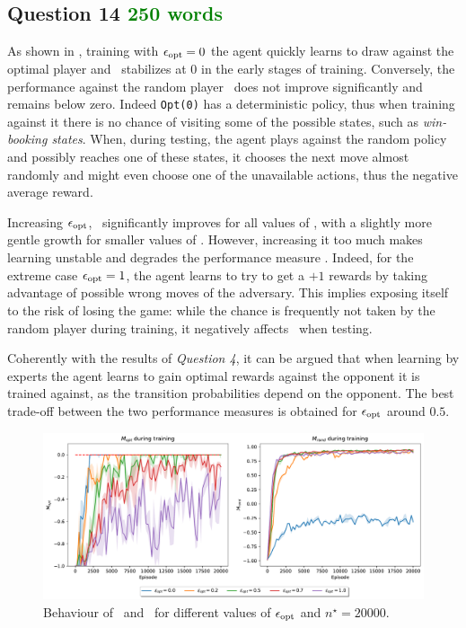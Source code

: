 \documentclass[10pt]{IEEEtran}
\begin{document}
\subsection*{Question 14 \textcolor{green}{250 words}}
As shown in , training with $\epsilon_{\text{opt}} = 0$ the agent quickly learns to draw against the optimal player and \mopt \ stabilizes at $0$ in the early stages of training. Conversely, the performance against the random player \mrand\  does not improve significantly and remains below zero. Indeed \texttt{Opt(0)} has a deterministic policy, thus when training against it there is no chance of visiting some of the possible states, such as \emph{win-booking states}. When, during testing, the agent plays against the random policy and possibly reaches one of these states, it chooses the next move almost randomly and might even choose one of the unavailable actions, thus the negative average reward. 

Increasing $\epsilon_{\text{opt}}$, \mrand\ significantly improves for all values of \eopt, with a slightly more gentle growth for smaller values of \eopt. However, increasing it too much makes learning unstable and degrades the performance measure \mopt. Indeed, for the extreme case $\epsilon_{\text{opt}} = 1$, the agent learns to try to get a $+1$ rewards by taking advantage of possible wrong moves of the adversary. This implies exposing itself to the risk of losing the game: while the chance is frequently not taken by the random player during training, it negatively affects \mopt\ when testing. 

Coherently with the results of \emph{Question 4}, it can be argued that when learning by experts the agent learns to gain optimal rewards against the opponent it is trained against, as the transition probabilities depend on the opponent. The best trade-off between the two performance measures is obtained for $\epsilon_{\text{opt}}$ around $0.5$. 
\begin{figure}[h]
    \centering
    \includegraphics[width = \linewidth]{code/figures/performance_dqn_epsilon_opt_experts.pdf}
    \caption{Behaviour of \mopt\  and \mrand\ for different values of $\epsilon_{\text{opt}}$ and $n^{\star} = 20000$.}
    \label{plot_question14}
\end{figure}
\end{document}
